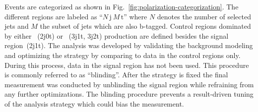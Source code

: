Events are categorized as shown in Fig.~\ref{fig:polarization-categorization}. The different regions are labeled as ``$N\,\mathrm{j}~M\,\mathrm{t}$'' where $N$ denotes the number of selected jets and $M$ the subset of jets which are also b-tagged. Control regions dominated by either \wjets~(2j0t) or \ttbar~(3j1t, 3j2t) production are defined besides the signal region~(2j1t). The analysis was developed by validating the background modeling and optimizing the strategy by comparing to data in the control regions only. During this process, data in the signal region has not been used. This procedure is commonly referred to as ``blinding''. After the strategy is fixed the final measurement was conducted by unblinding the signal region while refraining from any further optimizations. The blinding procedure prevents a result-driven tuning of the analysis strategy which could bias the measurement.



